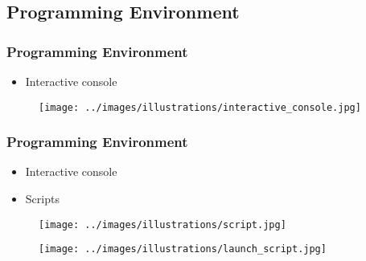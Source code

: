 \subsection{Programming Environment}
\begin{frame}\frametitle{Programming Environment}

   \begin{minipage}{0.4\linewidth}
      \begin{itemize}
         \item Interactive console   
      \end{itemize}
   \end{minipage}
   \begin{minipage}{0.58\linewidth}
      \begin{figure}[H]
         \texttt{[image: ../images/illustrations/interactive\_console.jpg]}
      \end{figure}
   \end{minipage}
\end{frame}



\begin{frame}\frametitle{Programming Environment}

   \begin{minipage}{0.4\linewidth}
      \begin{itemize}
         \item Interactive console   
         \item Scripts
      \end{itemize}
   \end{minipage}
   \begin{minipage}{0.58\linewidth}
      \begin{figure}[H]
         \texttt{[image: ../images/illustrations/script.jpg]}
      \end{figure}
      \begin{figure}[H]
         \texttt{[image: ../images/illustrations/launch\_script.jpg]}
      \end{figure}
   \end{minipage}
\end{frame}


